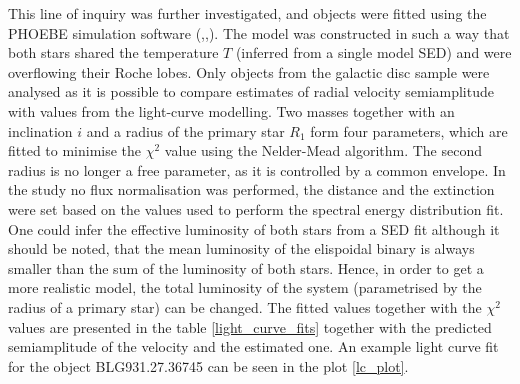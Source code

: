 \documentclass{pracalicmgr}
\begin{document}
This line of inquiry was further investigated, and objects were fitted using the
PHOEBE simulation software (\citet*{wilson_realization_1971},\citet*{prsa_computational_2005},\citet*{conroy_physics_2020}).
The model was constructed in such a way that both stars shared the temperature $T$ (inferred from a single model SED) and were overflowing their Roche lobes.
Only objects from the galactic disc sample were analysed as it is possible to compare estimates of radial velocity semiamplitude with
values from the light-curve modelling.
Two masses together with an inclination $i$ and a radius of the primary star $R_1$ form four parameters, which are fitted to minimise the $\chi^2$ value using the Nelder-Mead algorithm.
The second radius is no longer a free parameter, as it is controlled by a common envelope.
In the study no flux normalisation was performed, the distance and the extinction were set based on the values used to perform the spectral energy distribution fit.
One could infer the effective luminosity of both stars from a SED fit although it should be noted, that the mean luminosity of the elispoidal binary is always smaller 
than the sum of the luminosity of both stars. Hence, in order to get a more realistic model, the total luminosity of the system (parametrised by the radius of a primary star) can be 
changed. 
The fitted values together with the $\chi^2$ values are presented in the table \ref{light_curve_fits}
together with the predicted semiamplitude of the velocity and the estimated one.
An example light curve fit for the object BLG931.27.36745 can be seen in the plot \ref{lc_plot}.
\end{document}
